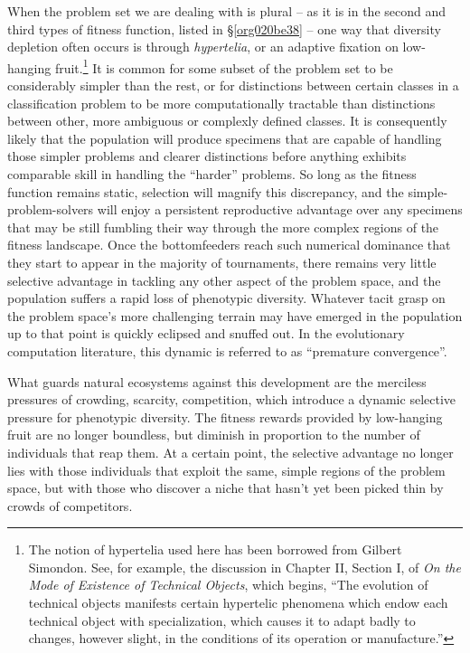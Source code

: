 \documentclass[12pt,glossary]{dalthesis}
\begin{document}
When the problem set we are dealing with is plural -- as it is in the second and third types
of fitness function, listed in \S \ref{org020be38} -- one way that diversity depletion often
occurs is through \emph{hypertelia}, or an adaptive fixation on low-hanging fruit.\footnote{The notion of hypertelia used here has been borrowed from Gilbert Simondon. See,
  for example, the discussion in Chapter II, Section I, of 
  \emph{On the Mode of Existence of Technical Objects}, which begins, ``The evolution of technical objects manifests certain hypertelic phenomena which
  endow each technical object with specialization, which causes it to adapt badly
  to changes, however slight, in the conditions of its operation or manufacture.''} 
It is common for some subset of the problem set to be considerably simpler than the rest,
or for distinctions between certain classes in a classification problem to be more computationally
tractable than distinctions between other, more ambiguous or complexly defined classes. 
It is consequently likely that the population will produce specimens that are capable of
handling those simpler problems and clearer distinctions before anything exhibits comparable
skill in handling the ``harder'' problems. So long as the fitness function remains static,
selection will magnify this discrepancy, and the simple-problem-solvers will enjoy a persistent
reproductive advantage over any specimens that may be still fumbling their way through the
more complex regions of the fitness landscape. Once the bottomfeeders reach such numerical
dominance that they start to appear in the majority of tournaments, there remains very little
selective advantage in tackling any other aspect of the problem space, and the population
suffers a rapid loss of phenotypic diversity. Whatever tacit grasp on the problem
space's more challenging terrain may have emerged in the population up to that point is
quickly eclipsed and snuffed out. In the evolutionary computation literature, this dynamic
is referred to as ``premature convergence''. 

What guards natural ecosystems against this development are the merciless
pressures of crowding, scarcity, competition, which introduce a dynamic selective
pressure for phenotypic diversity. The fitness rewards provided by low-hanging
fruit are no longer boundless, but diminish in proportion to the number of
individuals that reap them. At a certain point, the selective advantage no longer
lies with those individuals that exploit the same, simple regions of the problem
space, but with those who discover a niche that hasn't yet been picked thin by
crowds of competitors.
\end{document}
